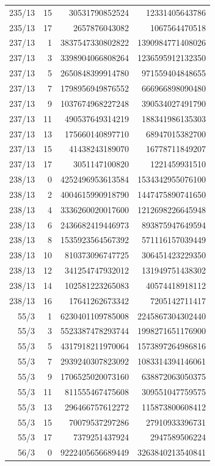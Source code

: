 \begin{longtable}{@{}rrrr@{}}
235/13 & 15 & 30531790852524 & 12331405643786\\
235/13 & 17 & 2657876043082 & 1067564470518\\
237/13 & 1 & 3837547330802822 & 1390984771408026\\
237/13 & 3 & 3398904066808264 & 1236595912132350\\
237/13 & 5 & 2650848399914780 & 971559404848655\\
237/13 & 7 & 1798956949876552 & 666966898090480\\
237/13 & 9 & 1037674968227248 & 390534027491790\\
237/13 & 11 & 490537649314219 & 188341986135303\\
237/13 & 13 & 175660140897710 & 68947015382700\\
237/13 & 15 & 41438243189070 & 16778711849207\\
237/13 & 17 & 3051147100820 & 1221459931510\\
238/13 & 0 & 4252496953613584 & 1534342955076100\\
238/13 & 2 & 4004615990918790 & 1447475890741650\\
238/13 & 4 & 3336260020017600 & 1212698226645948\\
238/13 & 6 & 2436682419446973 & 893875947649594\\
238/13 & 8 & 1535923564567392 & 571116157039449\\
238/13 & 10 & 810373096747725 & 306451423229350\\
238/13 & 12 & 341254747932012 & 131949751438302\\
238/13 & 14 & 102581223265083 & 40574418918112\\
238/13 & 16 & 17641262673342 & 7205142711417\\
55/3 & 1 & 6230401109785008 & 2245867304302440\\
55/3 & 3 & 5523387478293744 & 1998271651176900\\
55/3 & 5 & 4317918211970064 & 1573897264986816\\
55/3 & 7 & 2939240307823092 & 1083314394146061\\
55/3 & 9 & 1706525020073160 & 638872063050375\\
55/3 & 11 & 811555467475608 & 309551047759575\\
55/3 & 13 & 296466757612272 & 115873800608412\\
55/3 & 15 & 70079537297286 & 27910933396731\\
55/3 & 17 & 7379251437924 & 2947589506224\\
56/3 & 0 & 9222405656689449 & 3263840213540841\\

\end{longtable}
